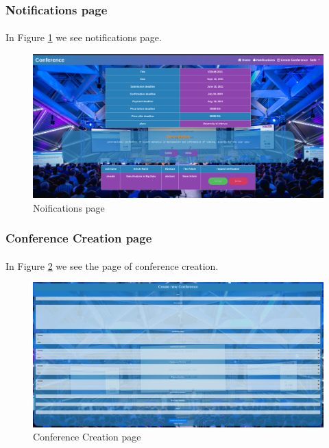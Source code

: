 \documentclass[12pt,a4paper]{article}
\begin{document}
	\subsubsection{Notifications page}
	\paragraph{}
	In Figure \ref{fig:notifications} we see notifications page.
	\begin{figure}
		\centering
		\includegraphics[width=\textwidth]{interfaces/details_organizer.png}
		\caption{Noifications page}
		\label{fig:notifications}
	\end{figure}
	\subsubsection{Conference Creation page}
	\paragraph{}
	In Figure \ref{fig:new-conf} we see the page of conference creation.
	\begin{figure}
		\centering
		\includegraphics[width=\textwidth]{interfaces/new_conference.png}
		\caption{Conference Creation page}
		\label{fig:new-conf}
	\end{figure}
	
\end{document}

